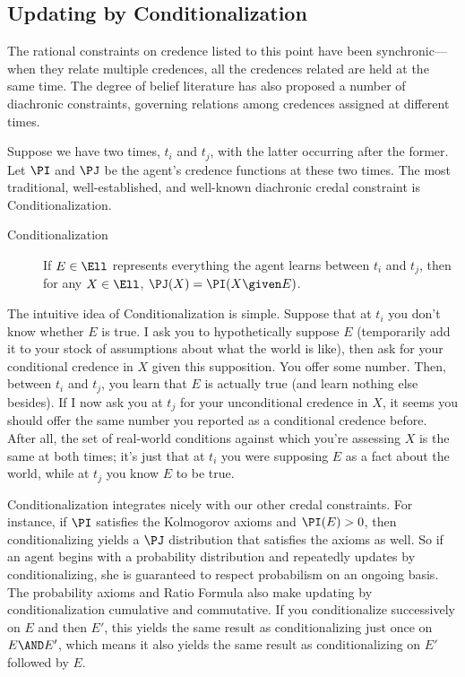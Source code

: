 \subsection{Updating by Conditionalization} \label{ss:Cond}
The rational constraints on credence listed to this point have been synchronic---when they relate multiple credences, all the credences related are held at the same time. The degree of belief literature has also proposed a number of diachronic constraints, governing relations among credences assigned at different times.

Suppose we have two times, $t_i$ and $t_j$, with the latter occurring after the former. Let $\PI$ and $\PJ$ be the agent's credence functions at these two times. The most traditional, well-established, and well-known diachronic credal constraint is Conditionalization.
\begin{description}
\item[Conditionalization]{If $E \in \Ell$ represents everything the agent learns between $t_i$ and $t_j$, then for any $X \in \Ell$, $\PJ(X)=\PI(X \given E)$.}
\end{description}
The intuitive idea of Conditionalization is simple. Suppose that at $t_i$ you don't know whether $E$ is true. I ask you to hypothetically suppose $E$ (temporarily add it to your stock of assumptions about what the world is like), then ask for your conditional credence in $X$ given this supposition. You offer some number. Then, between $t_i$ and $t_j$, you learn that $E$ is actually true (and learn nothing else besides). If I now ask you at $t_j$ for your unconditional credence in $X$, it seems you should offer the same number you reported as a conditional credence before. After all, the set of real-world conditions against which you're assessing $X$ is the same at both times; it's just that at $t_i$ you were supposing $E$ as a fact about the world, while at $t_j$ you know $E$ to be true.

Conditionalization integrates nicely with our other credal constraints. For instance, if $\PI$ satisfies the Kolmogorov axioms and $\PI(E)>0$, then conditionalizing yields a $\PJ$ distribution that satisfies the axioms as well. So if an agent begins with a probability distribution and repeatedly updates by conditionalizing, she is guaranteed to respect probabilism on an ongoing basis. The probability axioms and Ratio Formula also make updating by conditionalization cumulative and commutative. If you conditionalize successively on $E$ and then $E'$, this yields the same result as conditionalizing just once on $E \AND E'$, which means it also yields the same result as conditionalizing on $E'$ followed by $E$.      

